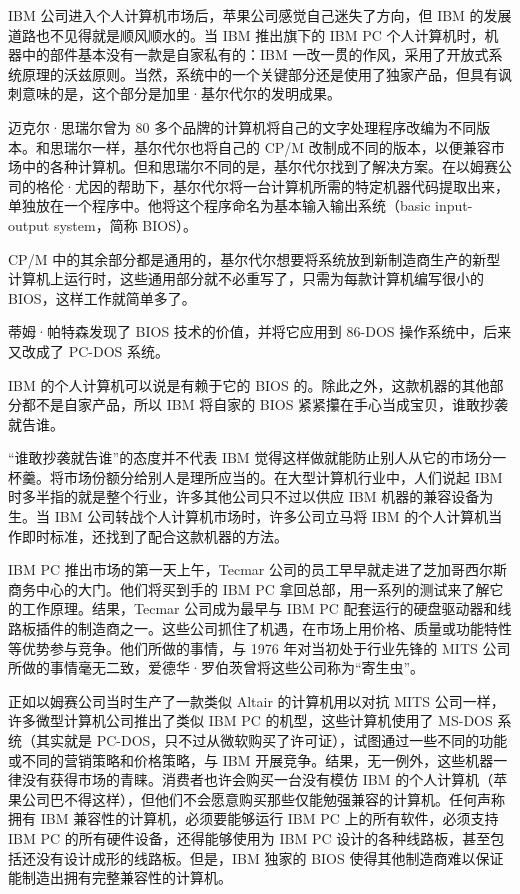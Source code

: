 \documentclass[12pt,UTF8]{ctexbook}
\begin{document}
IBM 公司进入个人计算机市场后，苹果公司感觉自己迷失了方向，但 IBM 的发展道路也不见得就是顺风顺水的。当 IBM 推出旗下的 IBM PC 个人计算机时，机器中的部件基本没有一款是自家私有的：IBM 一改一贯的作风，采用了开放式系统原理的沃兹原则。当然，系统中的一个关键部分还是使用了独家产品，但具有讽刺意味的是，这个部分是加里·基尔代尔的发明成果。

迈克尔·思瑞尔曾为 80 多个品牌的计算机将自己的文字处理程序改编为不同版本。和思瑞尔一样，基尔代尔也将自己的 CP/M 改制成不同的版本，以便兼容市场中的各种计算机。但和思瑞尔不同的是，基尔代尔找到了解决方案。在以姆赛公司的格伦·尤因的帮助下，基尔代尔将一台计算机所需的特定机器代码提取出来，单独放在一个程序中。他将这个程序命名为基本输入输出系统（basic input-output system，简称 BIOS）。

CP/M 中的其余部分都是通用的，基尔代尔想要将系统放到新制造商生产的新型计算机上运行时，这些通用部分就不必重写了，只需为每款计算机编写很小的 BIOS，这样工作就简单多了。

蒂姆·帕特森发现了 BIOS 技术的价值，并将它应用到 86-DOS 操作系统中，后来又改成了 PC-DOS 系统。

IBM 的个人计算机可以说是有赖于它的 BIOS 的。除此之外，这款机器的其他部分都不是自家产品，所以 IBM 将自家的 BIOS 紧紧攥在手心当成宝贝，谁敢抄袭就告谁。

“谁敢抄袭就告谁”的态度并不代表 IBM 觉得这样做就能防止别人从它的市场分一杯羹。将市场份额分给别人是理所应当的。在大型计算机行业中，人们说起 IBM 时多半指的就是整个行业，许多其他公司只不过以供应 IBM 机器的兼容设备为生。当 IBM 公司转战个人计算机市场时，许多公司立马将 IBM 的个人计算机当作即时标准，还找到了配合这款机器的方法。

IBM PC 推出市场的第一天上午，Tecmar 公司的员工早早就走进了芝加哥西尔斯商务中心的大门。他们将买到手的 IBM PC 拿回总部，用一系列的测试来了解它的工作原理。结果，Tecmar 公司成为最早与 IBM PC 配套运行的硬盘驱动器和线路板插件的制造商之一。这些公司抓住了机遇，在市场上用价格、质量或功能特性等优势参与竞争。他们所做的事情，与 1976 年对当初处于行业先锋的 MITS 公司所做的事情毫无二致，爱德华·罗伯茨曾将这些公司称为“寄生虫”。

正如以姆赛公司当时生产了一款类似 Altair 的计算机用以对抗 MITS 公司一样，许多微型计算机公司推出了类似 IBM PC 的机型，这些计算机使用了 MS-DOS 系统（其实就是 PC-DOS，只不过从微软购买了许可证），试图通过一些不同的功能或不同的营销策略和价格策略，与 IBM 开展竞争。结果，无一例外，这些机器一律没有获得市场的青睐。消费者也许会购买一台没有模仿 IBM 的个人计算机（苹果公司巴不得这样），但他们不会愿意购买那些仅能勉强兼容的计算机。任何声称拥有 IBM 兼容性的计算机，必须要能够运行 IBM PC 上的所有软件，必须支持 IBM PC 的所有硬件设备，还得能够使用为 IBM PC 设计的各种线路板，甚至包括还没有设计成形的线路板。但是，IBM 独家的 BIOS 使得其他制造商难以保证能制造出拥有完整兼容性的计算机。
\end{document}
